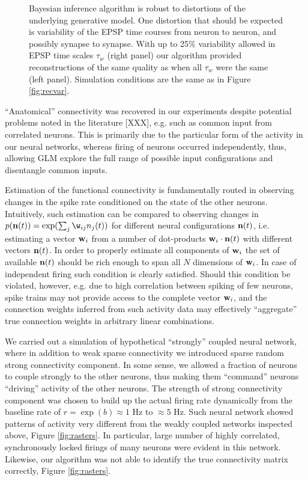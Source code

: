 \begin{figure}[h]
\begin{minipage}[c]{0.45\hsize}
\end{minipage}
\caption{Bayesian inference algorithm is robust to distortions of the
underlying generative model. One distortion that should be expected is variability of the EPSP time courses from neuron to neuron, and possibly synapse to synapse.
With up to 25\% variability allowed in EPSP time scales $\tau_w$ (right panel) our algorithm provided reconstructions of the same quality as when all $\tau_w$ were the same (left panel). Simulation conditions are the same as in Figure \ref{fig:recvar}.}
\label{fig:vartau}
\end{figure}


``Anatomical'' connectivity was recovered in our experiments despite potential problems noted in the literature [XXX], e.g. such as common input from correlated neurons. This is primarily due to the particular form of the activity in our neural networks, whereas firing of neurons occurred independently, thus, allowing GLM explore the full range of possible input configurations and disentangle common inputs.

Estimation of the functional connectivity is fundamentally routed in observing changes in the spike rate conditioned on the state of the other neurons. Intuitively, such estimation can be compared to observing changes in $p({\bf n}(t))=\exp(\sum_j \w_{ij}n_j(t))$ for different neural configurations ${\bf n}(t)$, i.e. estimating a vector ${\bf w}_i$ from a number of dot-products ${\bf w}_i\cdot {\bf n}(t)$ with different vectors ${\bf n}(t)$. In order to properly estimate all components of ${\bf w}_i$ the set of available ${\bf n}(t)$ should be rich enough to span all $N$ dimensions of ${\bf w}_i$. In case of independent firing such condition is clearly satisfied.  Should this condition be violated, however, e.g. due to high correlation between spiking of few neurons, spike trains may not provide access to the complete vector ${\bf w}_i$, and the connection weights inferred from such activity data may effectively ``aggregate'' true connection weights in arbitrary linear combinations.

We carried out a simulation of hypothetical ``strongly'' coupled  neural network, where in addition to weak sparse connectivity we introduced sparse random strong connectivity component. In some sense, we allowed a fraction of neurons to couple strongly to the other neurons, thus making them ``command'' neurons ``driving'' activity of the other neurons. The strength of strong connectivity component was chosen to build up the actual firing rate dynamically from the baseline rate of $r=\exp(b)\approx 1$ Hz to $\approx 5$  Hz.
Such neural network showed patterns of activity very different from the weakly coupled networks inspected above, Figure \ref{fig:rasters}.  In particular, large number of highly correlated, synchronously locked firings of many neurons were evident in this network.  Likewise, our algorithm was not able to identify the true connectivity matrix correctly, Figure \ref{fig:rasters}.

